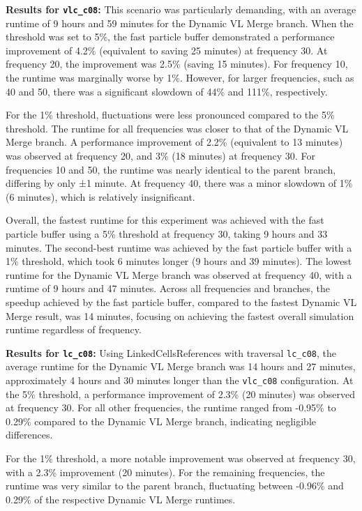 \textbf{Results for \texttt{vlc\_c08}:}  
This scenario was particularly demanding, with an average runtime of 9 hours and 59 minutes for the Dynamic VL Merge branch. When the threshold was set to 5\%, the fast particle buffer demonstrated a performance improvement of 4.2\% (equivalent to saving 25 minutes) at frequency 30. At frequency 20, the improvement was 2.5\% (saving 15 minutes). For frequency 10, the runtime was marginally worse by 1\%. However, for larger frequencies, such as 40 and 50, there was a significant slowdown of 44\% and 111\%, respectively.

For the 1\% threshold, fluctuations were less pronounced compared to the 5\% threshold. The runtime for all frequencies was closer to that of the Dynamic VL Merge branch. A performance improvement of 2.2\% (equivalent to 13 minutes) was observed at frequency 20, and 3\% (18 minutes) at frequency 30. For frequencies 10 and 50, the runtime was nearly identical to the parent branch, differing by only ±1 minute. At frequency 40, there was a minor slowdown of 1\% (6 minutes), which is relatively insignificant.

Overall, the fastest runtime for this experiment was achieved with the fast particle buffer using a 5\% threshold at frequency 30, taking 9 hours and 33 minutes. The second-best runtime was achieved by the fast particle buffer with a 1\% threshold, which took 6 minutes longer (9 hours and 39 minutes). The lowest runtime for the Dynamic VL Merge branch was observed at frequency 40, with a runtime of 9 hours and 47 minutes. Across all frequencies and branches, the speedup achieved by the fast particle buffer, compared to the fastest Dynamic VL Merge result, was 14 minutes, focusing on achieving the fastest overall simulation runtime regardless of frequency.

\textbf{Results for \texttt{lc\_c08}:}  
Using LinkedCellsReferences with traversal \texttt{lc\_c08}, the average runtime for the Dynamic VL Merge branch was 14 hours and 27 minutes, approximately 4 hours and 30 minutes longer than the \texttt{vlc\_c08} configuration. At the 5\% threshold, a performance improvement of 2.3\% (20 minutes) was observed at frequency 30. For all other frequencies, the runtime ranged from -0.95\% to 0.29\% compared to the Dynamic VL Merge branch, indicating negligible differences.

For the 1\% threshold, a more notable improvement was observed at frequency 30, with a 2.3\% improvement (20 minutes). For the remaining frequencies, the runtime was very similar to the parent branch, fluctuating between -0.96\% and 0.29\% of the respective Dynamic VL Merge runtimes.

